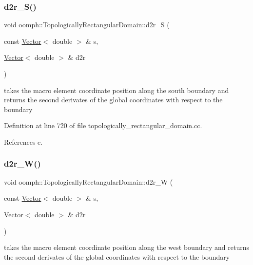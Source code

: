 \subsubsection{\texorpdfstring{d2r\+\_\+\+S()}{d2r\_S()}}
{\footnotesize\ttfamily void oomph\+::\+Topologically\+Rectangular\+Domain\+::d2r\+\_\+S (\begin{DoxyParamCaption}\item[{const \hyperlink{classoomph_1_1Vector}{Vector}$<$ double $>$ \&}]{s,  }\item[{\hyperlink{classoomph_1_1Vector}{Vector}$<$ double $>$ \&}]{d2r }\end{DoxyParamCaption})\hspace{0.3cm}{\ttfamily [private]}}



takes the macro element coordinate position along the south boundary and returns the second derivates of the global coordinates with respect to the boundary 



Definition at line 720 of file topologically\+\_\+rectangular\+\_\+domain.\+cc.



References e.

\mbox{\label{classoomph_1_1TopologicallyRectangularDomain_a4522f1751b8105bb7da4e1a14a75c05a}} 
\subsubsection{\texorpdfstring{d2r\+\_\+\+W()}{d2r\_W()}}
{\footnotesize\ttfamily void oomph\+::\+Topologically\+Rectangular\+Domain\+::d2r\+\_\+W (\begin{DoxyParamCaption}\item[{const \hyperlink{classoomph_1_1Vector}{Vector}$<$ double $>$ \&}]{s,  }\item[{\hyperlink{classoomph_1_1Vector}{Vector}$<$ double $>$ \&}]{d2r }\end{DoxyParamCaption})\hspace{0.3cm}{\ttfamily [private]}}



takes the macro element coordinate position along the west boundary and returns the second derivates of the global coordinates with respect to the boundary 



